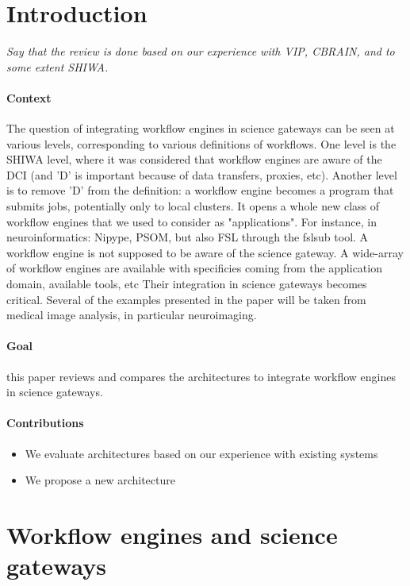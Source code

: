 \documentclass[preprint,3p,twocolumn]{elsarticle}
\newcommand{\todo}[1]{\color{blue}\xspace\emph{#1}\xspace\color{black}}
\begin{document}
\section{Introduction}

\todo{Say that the review is done based on our experience with VIP,
  CBRAIN, and to some extent SHIWA.}

\paragraph{Context} The question of integrating workflow engines in
science gateways can be seen at various levels, corresponding to
various definitions of workflows. One level is the SHIWA level, where
it was considered that workflow engines are aware of the DCI (and 'D'
is important because of data transfers, proxies, etc). Another level
is to remove 'D' from the definition: a workflow engine becomes a
program that submits jobs, potentially only to local clusters. It
opens a whole new class of workflow engines that we used to consider
as "applications". For instance, in neuroinformatics: Nipype, PSOM,
but also FSL through the fslsub tool. A workflow engine is not
supposed to be aware of the science gateway.  A wide-array of workflow
engines are available with specificies coming from the application
domain, available tools, etc Their integration in science gateways
becomes critical. Several of the examples presented in the
paper will be taken from medical image analysis, in particular
neuroimaging.

\paragraph{Goal} this paper reviews and compares the architectures to
integrate workflow engines in science gateways.

\paragraph{Contributions}
\begin{itemize}
\item We evaluate architectures based on our experience with existing systems
\item We propose a new architecture
\end{itemize}

\section{Workflow engines and science gateways}
\end{document}
